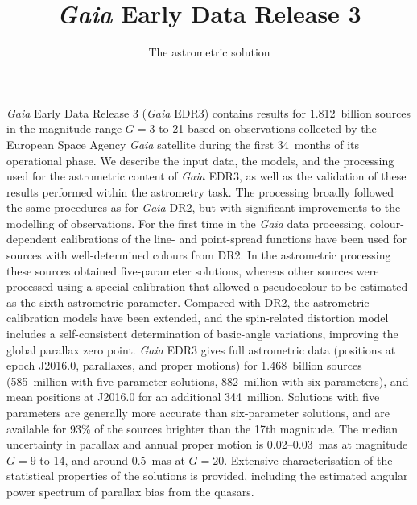 \documentclass[longauth]{aa} %
\begin{document}
 


   \title{\textit{Gaia} Early Data Release 3}
   \subtitle{The astrometric solution}

%


   \date{ }

 
\abstract
  {\textit{Gaia} Early Data Release 3 (\textit{Gaia} EDR3) contains results for 1.812~billion sources 
  in the magnitude range $G=3$ to 21 based on observations collected by the European Space
  Agency \textit{Gaia} satellite during the first 34~months of its operational phase.}  
  {We describe the input data, the models, and the processing used for the astrometric content
  of \textit{Gaia} EDR3, as well as the validation of these results performed within the astrometry task.}  
  {The processing broadly followed the same procedures as for \textit{Gaia} DR2, but with significant 
  improvements to the modelling of observations. 
  For the first time in the \textit{Gaia} data processing, colour-dependent calibrations of the line- and 
  point-spread functions have been used for sources with well-determined colours from DR2. 
  In the astrometric 
  processing these sources obtained five-parameter solutions, whereas other sources were processed 
  using a special calibration that allowed a pseudocolour to be estimated as the sixth astrometric parameter. 
  Compared with DR2, the astrometric calibration models have been extended, and the spin-related 
  distortion model includes a self-consistent determination of basic-angle variations, improving the 
  global parallax zero point.}  
  {\textit{Gaia} EDR3 gives full astrometric data (positions at epoch J2016.0, parallaxes, and proper 
  motions) for 1.468~billion sources (585~million with five-parameter solutions, 882~million with
  six parameters), and mean positions at J2016.0 for an additional 344~million. 
  Solutions with five parameters are generally more accurate than six-parameter solutions, and are 
  available for 93\% of the sources brighter than the 17th magnitude. 
  The median uncertainty in parallax and annual proper motion is 0.02--0.03~mas at magnitude $G=9$ 
  to 14, and around 0.5~mas at  $G=20$. Extensive characterisation of the statistical properties of the
  solutions is provided, including the estimated angular power spectrum of parallax bias from the quasars.}
  {}
\end{document}
